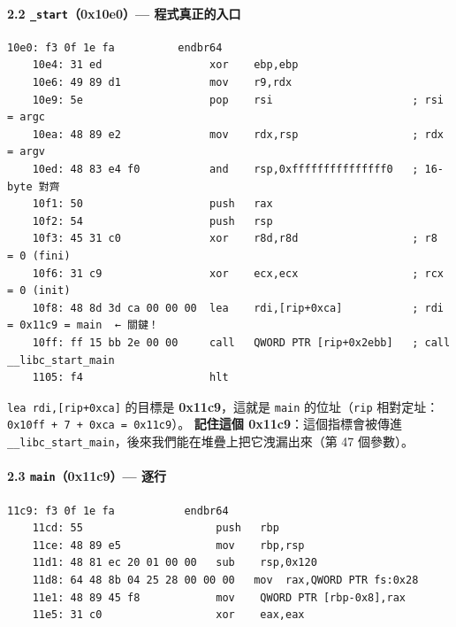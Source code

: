\documentclass[10pt,a4paper]{article}
\begin{document}
\paragraph{\texorpdfstring{2.2 \texttt{\_\allowbreak{}start}（0x10e0）---
程式真正的入口}{2.2 \_start（0x10e0）--- 程式真正的入口}}\label{start0x10e0-ux7a0bux5f0fux771fux6b63ux7684ux5165ux53e3}

\begin{Verbatim}[breaklines=true,breakanywhere=true,breakautoindent=false,fontsize=\fontsize{7.0}{9.5}\selectfont]
    10e0: f3 0f 1e fa          endbr64
    10e4: 31 ed                 xor    ebp,ebp
    10e6: 49 89 d1              mov    r9,rdx
    10e9: 5e                    pop    rsi                      ; rsi = argc
    10ea: 48 89 e2              mov    rdx,rsp                  ; rdx = argv
    10ed: 48 83 e4 f0           and    rsp,0xfffffffffffffff0   ; 16-byte 對齊
    10f1: 50                    push   rax
    10f2: 54                    push   rsp
    10f3: 45 31 c0              xor    r8d,r8d                  ; r8  = 0 (fini)
    10f6: 31 c9                 xor    ecx,ecx                  ; rcx = 0 (init)
    10f8: 48 8d 3d ca 00 00 00  lea    rdi,[rip+0xca]           ; rdi = 0x11c9 = main  ← 關鍵！
    10ff: ff 15 bb 2e 00 00     call   QWORD PTR [rip+0x2ebb]   ; call __libc_start_main
    1105: f4                    hlt
\end{Verbatim}

\texttt{lea\ \allowbreak{}rdi,{[}rip+0xca{]}} 的目標是 \textbf{0x11c9}，這就是
\texttt{main} 的位址（\texttt{rip}
相對定址：\texttt{0x10ff\ \allowbreak{}+\ \allowbreak{}7\ \allowbreak{}+\ \allowbreak{}0xca\ \allowbreak{}=\ \allowbreak{}0x11c9}）。 \textbf{記住這個
0x11c9}：這個指標會被傳進
\texttt{\_\allowbreak{}\_\allowbreak{}libc\_\allowbreak{}start\_\allowbreak{}main}，後來我們能在堆疊上把它洩漏出來（第 47
個參數）。

\paragraph{\texorpdfstring{2.3 \texttt{main}（0x11c9）---
逐行}{2.3 main（0x11c9）--- 逐行}}\label{main0x11c9-ux9010ux884c}

\begin{Verbatim}[breaklines=true,breakanywhere=true,breakautoindent=false,fontsize=\fontsize{7.0}{9.5}\selectfont]
    11c9: f3 0f 1e fa           endbr64
    11cd: 55                     push   rbp
    11ce: 48 89 e5               mov    rbp,rsp
    11d1: 48 81 ec 20 01 00 00   sub    rsp,0x120
    11d8: 64 48 8b 04 25 28 00 00 00   mov  rax,QWORD PTR fs:0x28
    11e1: 48 89 45 f8            mov    QWORD PTR [rbp-0x8],rax
    11e5: 31 c0                  xor    eax,eax
\end{Verbatim}
\end{document}
